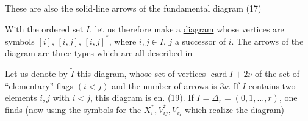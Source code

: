 
These are also the  solid-line arrows of the fundamental diagram (17)

With the ordered set $I$, let us therefore make a  \uline{diagram} whose vertices are  symbols  $[i]$, $[i,j]$, $[i,j]^*$, where $i,j\in I$, $j$ a successor of $i$. The arrows of the diagram are  three types which are all described in

Let us denote by $\widetilde I$ this diagram, whose set of vertices     $\operatorname{card}I+2\nu$   of the set of ``elementary'' flags $(i<j)$  and the number of arrows is $3\nu$. If $I$ contains  two elements $i,j$ with $i<j$,  this diagram is en. (19). If $I=\Delta_r=(0,1,\ldots,r)$, one finds (now using the symbols for the $X_i^*,V_{ij}^*,V_{ij}$ which realize the diagram)

